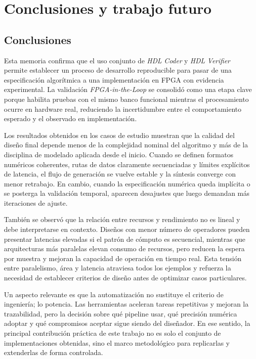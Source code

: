 \chapter{Conclusiones y trabajo futuro}

\section{Conclusiones}
Esta memoria confirma que el uso conjunto de \textit{HDL Coder} y \textit{HDL Verifier} permite establecer un proceso de desarrollo reproducible para pasar de una especificación algorítmica a una implementación en FPGA con evidencia experimental. La validación \textit{FPGA-in-the-Loop} se consolidó como una etapa clave porque habilita pruebas con el mismo banco funcional mientras el procesamiento ocurre en hardware real, reduciendo la incertidumbre entre el comportamiento esperado y el observado en implementación.

Los resultados obtenidos en los casos de estudio muestran que la calidad del diseño final depende menos de la complejidad nominal del algoritmo y más de la disciplina de modelado aplicada desde el inicio. Cuando se definen formatos numéricos coherentes, rutas de datos claramente secuenciadas y límites explícitos de latencia, el flujo de generación se vuelve estable y la síntesis converge con menor retrabajo. En cambio, cuando la especificación numérica queda implícita o se posterga la validación temporal, aparecen desajustes que luego demandan más iteraciones de ajuste.

También se observó que la relación entre recursos y rendimiento no es lineal y debe interpretarse en contexto. Diseños con menor número de operadores pueden presentar latencias elevadas si el patrón de cómputo es secuencial, mientras que arquitecturas más paralelas elevan consumo de recursos, pero reducen la espera por muestra y mejoran la capacidad de operación en tiempo real. Esta tensión entre paralelismo, área y latencia atraviesa todos los ejemplos y refuerza la necesidad de establecer criterios de diseño antes de optimizar casos particulares.

Un aspecto relevante es que la automatización no sustituye el criterio de ingeniería; lo potencia. Las herramientas aceleran tareas repetitivas y mejoran la trazabilidad, pero la decisión sobre qué pipeline usar, qué precisión numérica adoptar y qué compromisos aceptar sigue siendo del diseñador. En ese sentido, la principal contribución práctica de este trabajo no es solo el conjunto de implementaciones obtenidas, sino el marco metodológico para replicarlas y extenderlas de forma controlada.

